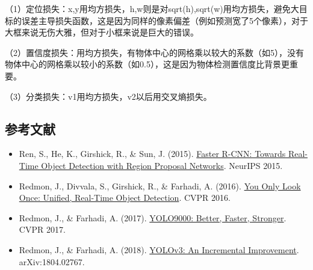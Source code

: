 （1）定位损失：x,y用均方损失，h,w则是对sqrt(h),sqrt(w)用均方损失，避免大目标的误差主导损失函数，这是因为同样的像素偏差（例如预测宽了5个像素），对于大框来说无伤大雅，但对于小框来说是巨大的错误。

（2）置信度损失：用均方损失，有物体中心的网格乘以较大的系数（如5），没有物体中心的网格乘以较小的系数（如0.5），这是因为物体检测置信度比背景更重要。

（3）分类损失：v1用均方损失，v2以后用交叉熵损失。

\hypertarget{ux53c2ux8003ux6587ux732e-16}{%
\subsection{参考文献}\label{ux53c2ux8003ux6587ux732e-16}}

\vspace{0.25em}
\begin{itemize}
\tightlist
\item
  Ren, S., He, K., Girshick, R., \& Sun, J. (2015). \href{https://proceedings.neurips.cc/paper/2015/hash/14bfa6bb14875e45bba028a21ed38046-Abstract.html}{Faster R-CNN: Towards Real-Time Object Detection with Region Proposal Networks}. NeurIPS 2015.
\item
  Redmon, J., Divvala, S., Girshick, R., \& Farhadi, A. (2016). \href{https://arxiv.org/abs/1506.02640}{You Only Look Once: Unified, Real-Time Object Detection}. CVPR 2016.
\item
  Redmon, J., \& Farhadi, A. (2017). \href{https://arxiv.org/abs/1612.08242}{YOLO9000: Better, Faster, Stronger}. CVPR 2017.
\item
  Redmon, J., \& Farhadi, A. (2018). \href{https://arxiv.org/abs/1804.02767}{YOLOv3: An Incremental Improvement}. arXiv:1804.02767.
\end{itemize}

\clearpage
